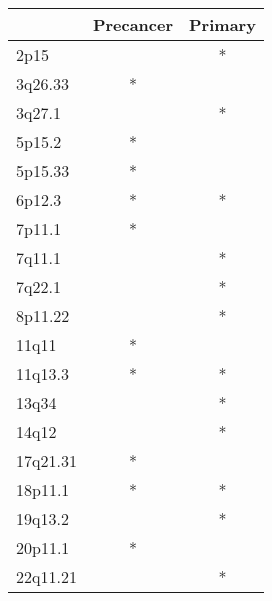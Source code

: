\begin{tabular}{lcc}
\toprule
{} & Precancer & Primary \\
\midrule
2p15     &           &       * \\
3q26.33  &         * &         \\
3q27.1   &           &       * \\
5p15.2   &         * &         \\
5p15.33  &         * &         \\
6p12.3   &         * &       * \\
7p11.1   &         * &         \\
7q11.1   &           &       * \\
7q22.1   &           &       * \\
8p11.22  &           &       * \\
11q11    &         * &         \\
11q13.3  &         * &       * \\
13q34    &           &       * \\
14q12    &           &       * \\
17q21.31 &         * &         \\
18p11.1  &         * &       * \\
19q13.2  &           &       * \\
20p11.1  &         * &         \\
22q11.21 &           &       * \\
\bottomrule
\end{tabular}
